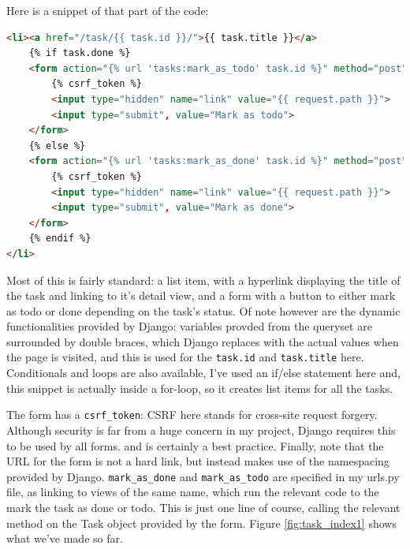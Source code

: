 \documentclass{article}
\begin{document}
Here is a snippet of that part of the code:
\begin{lstlisting}[language=HTML]
<li><a href="/task/{{ task.id }}/">{{ task.title }}</a>
    {% if task.done %}
    <form action="{% url 'tasks:mark_as_todo' task.id %}" method="post">
        {% csrf_token %}
        <input type="hidden" name="link" value="{{ request.path }}">
        <input type="submit", value="Mark as todo">
    </form>
    {% else %}
    <form action="{% url 'tasks:mark_as_done' task.id %}" method="post">
        {% csrf_token %}
        <input type="hidden" name="link" value="{{ request.path }}">
        <input type="submit", value="Mark as done">
    </form>
    {% endif %}
</li>
\end{lstlisting}

Most of this is fairly standard:
a list item,
with a hyperlink displaying the title of the task and linking to it's detail view,
and a form with a button to either mark as todo or done depending on the task's status.
Of note however are the dynamic functionalities provided by Django:
variables provded from the queryset are surrounded by double braces,
which Django replaces with the actual values when the page is visited,
and this is used for the \texttt{task.id} and \texttt{task.title} here.
Conditionals and loops are also available,
I've used an if/else statement here and,
this snippet is actually inside a for-loop,
so it creates list items for all the tasks.

The form has a \texttt{csrf\_token}:
CSRF here stands for cross-site request forgery.
Although security is far from a huge concern in my project,
Django requires this to be used by all forms.
and is certainly a best practice.
Finally, note that the URL for the form is not a hard link,
but instead makes use of the namespacing provided by Django.
\texttt{mark\_as\_done} and \texttt{mark\_as\_todo} are specified in my urls.py file,
as linking to views of the same name,
which run the relevant code to the mark the task as done or todo.
This is just one line of course,
calling the relevant method on the Task object provided by the form.
Figure \ref{fig:task_index1} shows what we've made so far.
\end{document}
